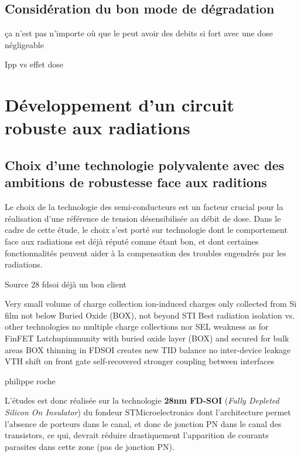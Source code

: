 \subsection{ Considération du bon mode de dégradation}

\begin{metsUneSource}
ça n'est pas n'importe où que le peut avoir des debits si fort avec une dose négligeable
\end{metsUneSource}

\begin{metsUneSource}
Ipp vs effet dose
\end{metsUneSource}

\section{Développement d’un circuit robuste aux radiations}
\subsection{Choix d’une technologie polyvalente avec des ambitions de robustesse face aux raditions}

Le choix de la technologie des semi-conducteurs est un facteur crucial pour la réalisation d'une référence de tension désensibilisée au débit de dose. Dans le cadre de cette étude, le choix s’est porté sur technologie dont le comportement face aux radiations est déjà réputé comme étant bon, et dont certaines fonctionnalités peuvent aider à la compensation des troubles engendrés par les radiations.


\begin{metsUneSource}
Source 28 fdsoi déjà un bon client


Very small volume of charge collection ion-induced charges only collected from Si film not below Buried Oxide (BOX), not beyond STI Best radiation isolation vs. other technologies no multiple charge collections nor SEL weakness as for FinFET Latchupimmunity with buried oxide layer (BOX) and secured for bulk areas BOX thinning in FDSOI creates new TID balance no inter-device leakage VTH shift on front gate self-recovered stronger coupling between interfaces

philippe roche
\end{metsUneSource}



L’études est donc réalisée sur la technologie \textbf{28nm FD-SOI} (\textit{Fully Depleted Silicon On Insulator}) du fondeur STMicroelectronics dont l’architecture permet l’absence de porteurs dans le canal, et donc de jonction PN dans le canal des transistors, ce qui, devrait réduire drastiquement l’apparition de courants parasites dans cette zone (pas de jonction PN).

